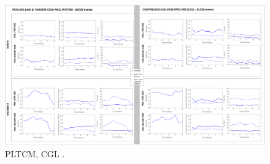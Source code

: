 \begin{landscape}
\begin{figure}[ht]
	\centering
	\includegraphics[width=1.35\textwidth]{../images/supplements-PLTCM_CGL_real_life_events_analysis-results-curves_and_discrete_time.png}
	\caption{PLTCM, CGL \cc{} \ee{}.}
	\label{figure-supplements-PLTCM_CGL-curveplots_discrete}
\end{figure}
\end{landscape}